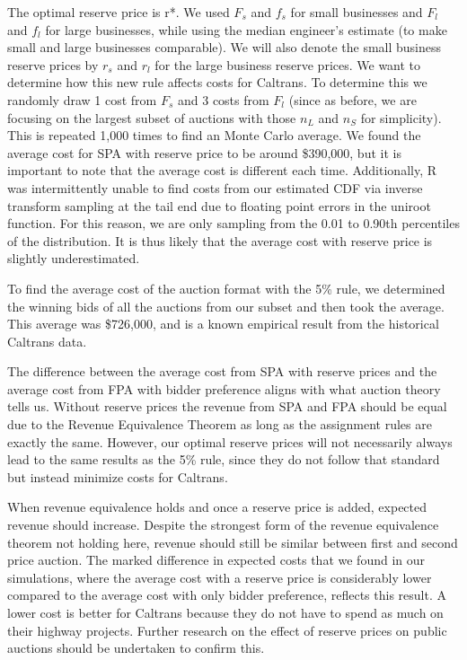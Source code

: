 The optimal reserve price is r*. We used $F_s$ and $f_s$ for small businesses and $F_l$ and $f_l$ for large businesses, while using the median engineer's estimate (to make small and large businesses comparable).
We will also denote the small business reserve prices by \( r_s \)  and $r_l$ for the large business reserve prices.
We want to determine how this new rule affects costs for Caltrans. To determine this we randomly draw 1 cost from $F_s$ and 3 costs from $F_l$ (since as before, we are focusing on the largest subset of auctions with those \(n_L\) and \(n_S\) for simplicity).
This is repeated 1,000 times to find an Monte Carlo average. We found the average cost for SPA with reserve price to be around \$390,000, but it is important to note that the average cost is different each time.
Additionally, R was intermittently unable to find costs from our estimated
CDF via inverse transform sampling at the tail end due to floating
point errors in the uniroot function. For this reason,
we are only sampling from the 0.01 to 0.90th percentiles of the distribution.
It is thus likely that the average cost with reserve price is slightly
underestimated.

 To find the average cost of the auction format with the 5\% rule, we determined the winning bids of all the auctions from our subset and then took the average. This average was \$726,000, and is a known empirical
result from the historical Caltrans data.

The difference between the average cost from SPA with reserve prices and the average cost from FPA with bidder preference aligns with what auction theory tells us. Without reserve prices the revenue from SPA and FPA should be equal due to the Revenue Equivalence Theorem as long as the
assignment rules are exactly the same. However, our optimal reserve
prices will not necessarily always lead to the same results as the 5\% rule,
since they do not follow that standard but instead minimize costs for Caltrans.

 When revenue equivalence holds and once a reserve price is added, expected revenue should increase. Despite the strongest form of the revenue equivalence
theorem not holding here, revenue should still be similar between first and second price auction. The marked difference in expected costs that we found
in our simulations, where the average cost with a reserve price is considerably lower compared to the average cost with only bidder preference,
reflects this result. A lower cost is better for Caltrans because they do not have to spend as much on their highway projects. Further research on
the effect of reserve prices on public auctions should be undertaken to confirm this.

